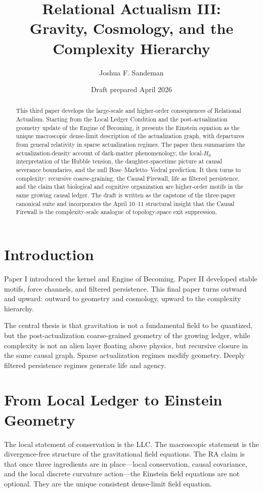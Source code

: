 \documentclass[11pt]{article}
\title{Relational Actualism III:\\Gravity, Cosmology, and the Complexity Hierarchy}
\author{Joshua F. Sandeman}
\date{Draft prepared April 2026}
\begin{document}
\maketitle

\begin{abstract}
This third paper develops the large-scale and higher-order consequences of Relational Actualism. Starting from the Local Ledger Condition and the post-actualization geometry update of the Engine of Becoming, it presents the Einstein equation as the unique macroscopic dense-limit description of the actualization graph, with departures from general relativity in sparse actualization regimes. The paper then summarizes the actualization-density account of dark-matter phenomenology, the local-$H_0$ interpretation of the Hubble tension, the daughter-spacetime picture at causal severance boundaries, and the null Bose--Marletto--Vedral prediction. It then turns to complexity: recursive coarse-graining, the Causal Firewall, life as filtered persistence, and the claim that biological and cognitive organization are higher-order motifs in the same growing causal ledger. The draft is written as the capstone of the three-paper canonical suite and incorporates the April 10--11 structural insight that the Causal Firewall is the complexity-scale analogue of topology-space exit suppression.
\end{abstract}

\section{Introduction}
Paper I introduced the kernel and Engine of Becoming. Paper II developed stable motifs, force channels, and filtered persistence. This final paper turns outward and upward: outward to geometry and cosmology, upward to the complexity hierarchy.

The central thesis is that gravitation is not a fundamental field to be quantized, but the post-actualization coarse-grained geometry of the growing ledger, while complexity is not an alien layer floating above physics, but recursive closure in the same causal graph. Sparse actualization regimes modify geometry. Deeply filtered persistence regimes generate life and agency.

\section{From Local Ledger to Einstein Geometry}
The local statement of conservation is the LLC. The macroscopic statement is the divergence-free structure of the gravitational field equations. The RA claim is that once three ingredients are in place---local conservation, causal covariance, and the local discrete curvature action---the Einstein field equations are not optional. They are the unique consistent dense-limit field equation.
\end{document}
